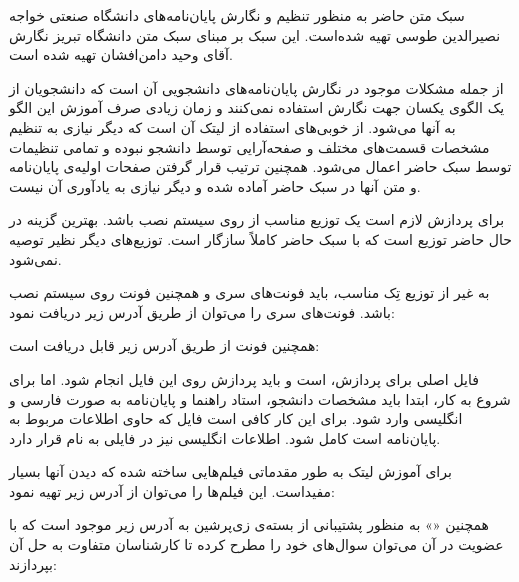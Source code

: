 



سبک متن حاضر به منظور تنظیم و نگارش پایان‌نامه‌های 
دانشگاه صنعتی خواجه نصیرالدین طوسی
تهیه شده‌است.  این سبک بر مبنای سبک متن دانشگاه تبریز
 نگارش آقای وحید دامن‌افشان تهیه شده است.


از جمله مشکلات موجود در نگارش پایان‌نامه‌های دانشجویی آن است که دانشجویان
از یک الگوی یکسان جهت نگارش استفاده نمی‌کنند و زمان زیادی صرف آموزش این
الگو به آنها می‌شود. 
از خوبی‌های استفاده از لیتک آن است که دیگر نیازی به تنظیم مشخصات قسمت‌های 
مختلف و صفحه‌آرایی توسط دانشجو نبوده و تمامی تنظیمات توسط سبک حاضر اعمال می‌شود.
همچنین ترتیب قرار گرفتن صفحات اولیه‌ی پایان‌نامه و متن آنها در سبک حاضر آماده شده
و دیگر نیازی به یادآوری آن نیست.









برای پردازش لازم است یک توزیع مناسب از  روی سیستم نصب باشد. 
بهترین گزینه در حال حاضر توزیع   است که با سبک حاضر کاملاً سازگار است.
توزیع‌های دیگر  نظیر   توصیه نمی‌شود.

به غیر از توزیع تِک مناسب، باید فونت‌های سری  و همچنین فونت 
روی سیستم نصب باشد.
فونت‌های سری  را می‌توان از طریق آدرس زیر دریافت نمود:
\begin{LTR}
\end{LTR}

همچنین فونت  از طریق آدرس زیر قابل دریافت است:
\begin{LTR}
\end{LTR}


فایل اصلی برای پردازش،  است و باید پردازش روی این فایل انجام شود.
اما برای شروع به کار، ابتدا باید مشخصات دانشجو، استاد راهنما و پایان‌نامه
به صورت فارسی و انگلیسی وارد شود.
برای این کار کافی است فایل  که حاوی اطلاعات مربوط به 
پایان‌نامه است کامل شود. اطلاعات انگلیسی نیز در فایلی به نام    
قرار دارد.


برای آموزش لیتک به طور مقدماتی فیلم‌هایی ساخته شده که 
دیدن آنها بسیار مفیداست. این فیلم‌ها را می‌توان از آدرس زیر تهیه نمود:
\begin{LTR}
\end{LTR}
همچنین «» به منظور پشتیبانی  از بسته‌ی زی‌پرشین به آدرس زیر موجود
است که با عضویت در آن می‌توان  سوال‌های خود را مطرح کرده تا کارشناسان متفاوت
به حل آن بپردازند:

\begin{LTR}
\end{LTR}







